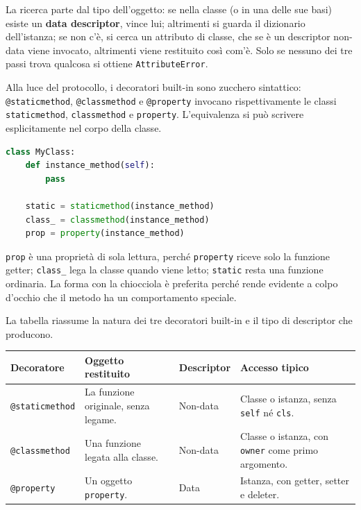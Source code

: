 \documentclass[12pt]{extarticle}
\begin{document}
\noindent La ricerca parte dal tipo dell'oggetto: se nella classe (o in una delle sue basi) esiste un \textbf{data descriptor}, vince lui; altrimenti si guarda il dizionario dell'istanza; se non c'è, si cerca un attributo di classe, che se è un descriptor non-data viene invocato, altrimenti viene restituito così com'è. Solo se nessuno dei tre passi trova qualcosa si ottiene \texttt{AttributeError}.

{\sloppy
\noindent Alla luce del protocollo, i decoratori built-in sono zucchero sintattico: \texttt{@staticmethod}, \texttt{@classmethod} e \texttt{@property} invocano rispettivamente le classi \texttt{staticmethod}, \texttt{classmethod} e \texttt{property}. L'equivalenza si può scrivere esplicitamente nel corpo della classe.\par}

\begin{lstlisting}[language=Python]
class MyClass:
    def instance_method(self):
        pass

    static = staticmethod(instance_method)
    class_ = classmethod(instance_method)
    prop = property(instance_method)
\end{lstlisting}

\noindent \texttt{prop} è una proprietà di sola lettura, perché \texttt{property} riceve solo la funzione getter; \texttt{class\_} lega la classe quando viene letto; \texttt{static} resta una funzione ordinaria. La forma con la chiocciola è preferita perché rende evidente a colpo d'occhio che il metodo ha un comportamento speciale.

\noindent La tabella riassume la natura dei tre decoratori built-in e il tipo di descriptor che producono.

\begin{center}
\small
\begin{tabular}{p{3.0cm}p{4.8cm}p{3.0cm}p{4.0cm}}
    \toprule
    \textbf{Decoratore} & \textbf{Oggetto restituito} & \textbf{Descriptor} & \textbf{Accesso tipico} \\
    \midrule
    \texttt{@staticmethod} & La funzione originale, senza legame. & Non-data & Classe o istanza, senza \texttt{self} né \texttt{cls}. \\
    \addlinespace
    \texttt{@classmethod} & Una funzione legata alla classe. & Non-data & Classe o istanza, con \texttt{owner} come primo argomento. \\
    \addlinespace
    \texttt{@property} & Un oggetto \texttt{property}. & Data & Istanza, con getter, setter e deleter. \\
    \bottomrule
\end{tabular}
\end{center}
\end{document}
